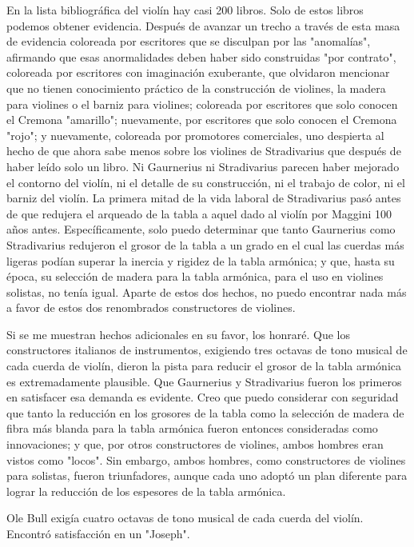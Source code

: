 \documentclass[12pt]{book}
\begin{document}
En la lista bibliográfica del violín hay casi 200 libros. Solo de estos libros podemos obtener evidencia. Después de avanzar un trecho a través de esta masa de evidencia coloreada por escritores que se disculpan por las "anomalías", afirmando que esas anormalidades deben haber sido construidas "por contrato", coloreada por escritores con imaginación exuberante, que olvidaron mencionar que no tienen conocimiento práctico de la construcción de violines, la madera para violines o el barniz para violines; coloreada por escritores que solo conocen el Cremona "amarillo"; nuevamente, por escritores que solo conocen el Cremona "rojo"; y nuevamente, coloreada por promotores comerciales, uno despierta al hecho de que ahora sabe menos sobre los violines de Stradivarius que después de haber leído solo un libro.
Ni Gaurnerius ni Stradivarius parecen haber mejorado el contorno del violín, ni el detalle de su construcción, ni el trabajo de color, ni el barniz del violín. La primera mitad de la vida laboral de Stradivarius pasó antes de que redujera el arqueado de la tabla a aquel dado al violín por Maggini 100 años antes. Específicamente, solo puedo determinar que tanto Gaurnerius como Stradivarius redujeron el grosor de la tabla a un grado en el cual las cuerdas más ligeras podían superar la inercia y rigidez de la tabla armónica; y que, hasta su época, su selección de madera para la tabla armónica, para el uso en violines solistas, no tenía igual. Aparte de estos dos hechos, no puedo encontrar nada más a favor de estos dos renombrados constructores de violines.

Si se me muestran hechos adicionales en su favor, los honraré. Que los constructores italianos de instrumentos, exigiendo tres octavas de tono musical de cada cuerda de violín, dieron la pista para reducir el grosor de la tabla armónica es extremadamente plausible. Que Gaurnerius y Stradivarius fueron los primeros en satisfacer esa demanda es evidente.
Creo que puedo considerar con seguridad que tanto la reducción en los grosores de la tabla como la selección de madera de fibra más blanda para la tabla armónica fueron entonces consideradas como innovaciones; y que, por otros constructores de violines, ambos hombres eran vistos como "locos". Sin embargo, ambos hombres, como constructores de violines para solistas, fueron triunfadores, aunque cada uno adoptó un plan diferente para lograr la reducción de los espesores de la tabla armónica.

Ole Bull exigía cuatro octavas de tono musical de cada cuerda del violín. Encontró satisfacción en un "Joseph".
\end{document}
